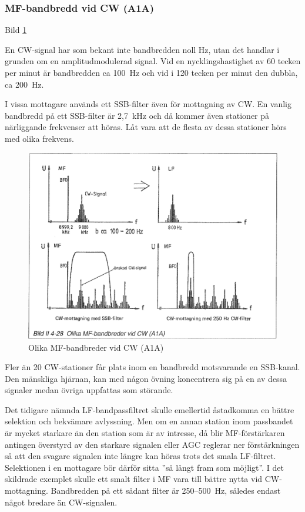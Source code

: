 \subsubsection{MF-bandbredd vid  CW (A1A)}

Bild \ref{fig:bildII4-28}

En CW-signal har som bekant inte bandbredden noll Hz, utan det handlar
i grunden om en amplitudmodulerad signal. Vid en nycklingshastighet av
60 tecken per minut är bandbredden ca 100~Hz och vid i 120 tecken per minut
den dubbla, ca 200~Hz.

I vissa mottagare används ett SSB-filter även för mottagning av CW. En
vanlig bandbredd på ett SSB-filter är 2,7~kHz och då kommer även
stationer på närliggande frekvenser att höras. Låt vara att de flesta
av dessa stationer hörs med olika frekvens.

\begin{figure}
  \includegraphics[width=\textwidth]{images/bild_2_4-28}
  \caption{Olika MF-bandbreder vid CW (A1A)}
  \label{fig:bildII4-28}
\end{figure}

Fler än 20 CW-stationer får plats inom en bandbredd motsvarande en
SSB-kanal. Den mänskliga hjärnan, kan med någon övning koncentrera sig
på en av dessa signaler medan övriga uppfattas som störande.

Det tidigare nämnda LF-bandpassfiltret skulle emellertid åstadkomma en
bättre selektion och bekvämare avlyssning. Men om en annan station
inom passbandet är mycket starkare än den station som är av intresse,
då blir MF-förstärkaren antingen överstyrd av den starkare signalen
eller AGC reglerar ner förstärkningen så att den svagare signalen inte
längre kan höras trots det smala LF-filtret. Selektionen i en
mottagare bör därför sitta ''så långt fram som möjligt''. I det
skildrade exemplet skulle ett smalt filter i MF vara till bättre nytta
vid CW-mottagning. Bandbredden på ett sådant filter är 250--500~Hz,
således endast något bredare än CW-signalen.

